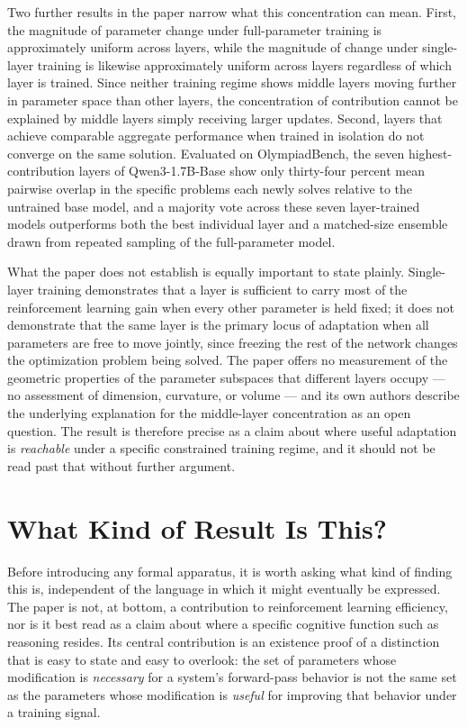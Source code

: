 \documentclass[11pt]{article}
\begin{document}
Two further results in the paper narrow what this concentration can mean. First, the magnitude of parameter change under full-parameter training is approximately uniform across layers, while the magnitude of change under single-layer training is likewise approximately uniform across layers regardless of which layer is trained. Since neither training regime shows middle layers moving further in parameter space than other layers, the concentration of contribution cannot be explained by middle layers simply receiving larger updates. Second, layers that achieve comparable aggregate performance when trained in isolation do not converge on the same solution. Evaluated on OlympiadBench, the seven highest-contribution layers of Qwen3-1.7B-Base show only thirty-four percent mean pairwise overlap in the specific problems each newly solves relative to the untrained base model, and a majority vote across these seven layer-trained models outperforms both the best individual layer and a matched-size ensemble drawn from repeated sampling of the full-parameter model.

What the paper does not establish is equally important to state plainly. Single-layer training demonstrates that a layer is sufficient to carry most of the reinforcement learning gain when every other parameter is held fixed; it does not demonstrate that the same layer is the primary locus of adaptation when all parameters are free to move jointly, since freezing the rest of the network changes the optimization problem being solved. The paper offers no measurement of the geometric properties of the parameter subspaces that different layers occupy --- no assessment of dimension, curvature, or volume --- and its own authors describe the underlying explanation for the middle-layer concentration as an open question. The result is therefore precise as a claim about where useful adaptation is \emph{reachable} under a specific constrained training regime, and it should not be read past that without further argument.

\section{What Kind of Result Is This?}

Before introducing any formal apparatus, it is worth asking what kind of finding this is, independent of the language in which it might eventually be expressed. The paper is not, at bottom, a contribution to reinforcement learning efficiency, nor is it best read as a claim about where a specific cognitive function such as reasoning resides. Its central contribution is an existence proof of a distinction that is easy to state and easy to overlook: the set of parameters whose modification is \emph{necessary} for a system's forward-pass behavior is not the same set as the parameters whose modification is \emph{useful} for improving that behavior under a training signal.
\end{document}
